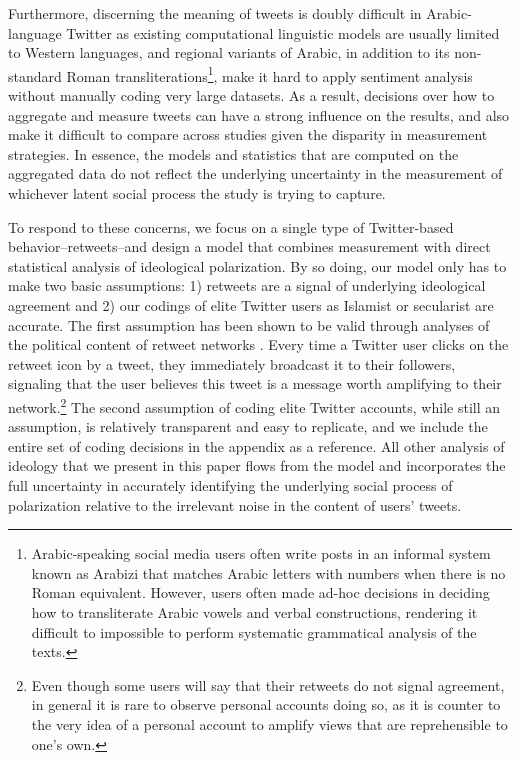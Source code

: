 \documentclass[12pt]{article}
\begin{document}
Furthermore, discerning the meaning of tweets is doubly difficult in Arabic-language Twitter as existing computational linguistic models are usually limited to Western languages, and regional variants of Arabic, in addition to its non-standard Roman transliterations\footnote{Arabic-speaking social media users often write posts in an informal system known as Arabizi that matches Arabic letters with numbers when there is no Roman equivalent. However, users often made ad-hoc decisions in deciding how to transliterate Arabic vowels and verbal constructions, rendering it difficult to impossible to perform systematic grammatical analysis of the texts.}, make it hard to apply sentiment analysis without manually coding very large datasets. As a result, decisions over how to aggregate and measure tweets can have a strong influence on the results, and also make it difficult to compare across studies given the disparity in measurement strategies. In essence, the models and statistics that are computed on the aggregated data do not reflect the underlying uncertainty in the measurement of whichever latent social process the study is trying to capture. 

To respond to these concerns, we focus on a single type of Twitter-based behavior--retweets--and design a model that combines measurement with direct statistical analysis of ideological polarization. By so doing, our model only has to make two basic assumptions: 1) retweets are a signal of underlying ideological agreement and 2) our codings of elite Twitter users as Islamist or secularist are accurate. The first assumption has been shown to be valid through analyses of the political content of retweet networks \parencite{conover2011}. Every time a Twitter user clicks on the retweet icon by a tweet, they immediately broadcast it to their followers, signaling that the user believes this tweet is a message worth amplifying to their network.\footnote{Even though some users will say that their retweets do not signal agreement, in general it is rare to observe personal accounts doing so, as it is counter to the very idea of a personal account to amplify views that are reprehensible to one's own.} The second assumption of coding elite Twitter accounts, while still an assumption, is relatively transparent and easy to replicate, and we include the entire set of coding decisions in the appendix as a reference. All other analysis of ideology that we present in this paper flows from the model and incorporates the full uncertainty in accurately identifying the underlying social process of polarization relative to the irrelevant noise in the content of users' tweets. 
\end{document}
